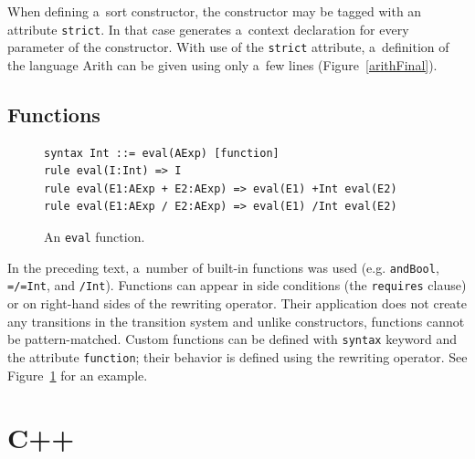 \documentclass[nolot,nolof,nocover,printed]{fithesis3}
\begin{document}
When defining a~sort constructor, the constructor may be tagged with an attribute \lstinline|strict|. In that case \K generates a~context declaration for every parameter of the constructor. With use of the \lstinline|strict| attribute, a~definition of the language Arith can be given using only a~few lines (Figure~\ref{arithFinal}).


\section{Functions}

\begin{figure}
\begin{lstlisting}
syntax Int ::= eval(AExp) [function]
rule eval(I:Int) => I
rule eval(E1:AExp + E2:AExp) => eval(E1) +Int eval(E2)
rule eval(E1:AExp / E2:AExp) => eval(E1) /Int eval(E2)
\end{lstlisting}
\caption{An \lstinline|eval| function.}
\label{figAnEvalFunction}
\end{figure}

In the preceding text, a~number of built-in functions was used (e.g. \lstinline|andBool|, \lstinline|=/=Int|, and \lstinline|/Int|). Functions can appear in side conditions (the \lstinline|requires| clause) or on right-hand sides of the rewriting operator. Their application does not create any transitions in the transition system and unlike constructors, functions cannot be pattern-matched. Custom functions can be defined with \lstinline|syntax| keyword and the attribute \lstinline|function|; their behavior is defined using the rewriting operator. See Figure~\ref{figAnEvalFunction} for an example. 




\chapter{C++}
\end{document}

